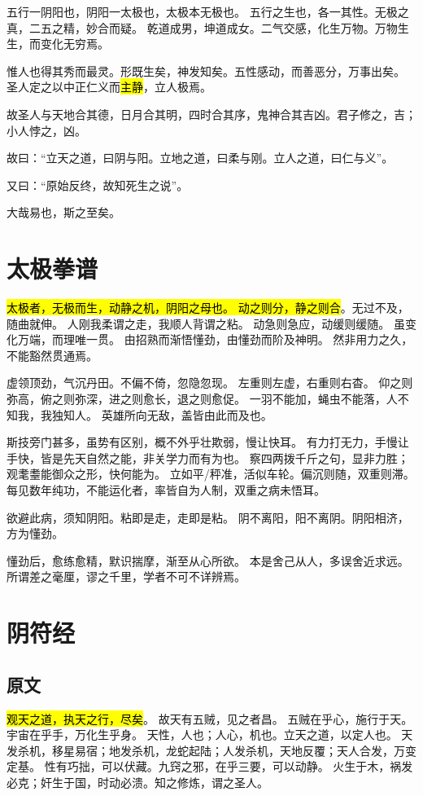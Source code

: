 五行一阴阳也，阴阳一太极也，太极本无极也。
五行之生也，各一其性。无极之真，二五之精，妙合而疑。
乾道成男，坤道成女。二气交感，化生万物。万物生生，而变化无穷焉。

惟人也得其秀而最灵。形既生矣，神发知矣。五性感动，而善恶分，万事出矣。
圣人定之以中正仁义而\hl{主静}，立人极焉。

故圣人与天地合其德，日月合其明，四时合其序，鬼神合其吉凶。君子修之，吉；小人悖之，凶。

故曰：“立天之道，曰阴与阳。立地之道，曰柔与刚。立人之道，曰仁与义”。

又曰：“原始反终，故知死生之说”。

大哉易也，斯之至矣。

\section{太极拳谱}

\hl{太极者，无极而生，动静之机，阴阳之母也。
动之则分，静之则合}。无过不及，随曲就伸。
人刚我柔谓之走，我顺人背谓之粘。
动急则急应，动缓则缓随。
虽变化万端，而理唯一贯。
由招熟而渐悟懂劲，由懂劲而阶及神明。
然非用力之久，不能豁然贯通焉。

虚领顶劲，气沉丹田。不偏不倚，忽隐忽现。
左重则左虚，右重则右杳。
仰之则弥高，俯之则弥深，进之则愈长，退之则愈促。
一羽不能加，蝇虫不能落，人不知我，我独知人。
英雄所向无敌，盖皆由此而及也。

斯技旁门甚多，虽势有区别，概不外乎壮欺弱，慢让快耳。
有力打无力，手慢让手快，皆是先天自然之能，非关学力而有为也。
察四两拨千斤之句，显非力胜；观耄耋能御众之形，快何能为。
立如平/秤准，活似车轮。偏沉则随，双重则滞。
每见数年纯功，不能运化者，率皆自为人制，双重之病未悟耳。

欲避此病，须知阴阳。粘即是走，走即是粘。
阴不离阳，阳不离阴。阴阳相济，方为懂劲。

懂劲后，愈练愈精，默识揣摩，渐至从心所欲。
本是舍己从人，多误舍近求远。
所谓差之毫厘，谬之千里，学者不可不详辨焉。

\section{阴符经}

\subsection{原文}

\hl{观天之道，执天之行，尽矣}。
故天有五贼，见之者昌。
五贼在乎心，施行于天。宇宙在乎手，万化生乎身。
天性，人也；人心，机也。立天之道，以定人也。
天发杀机，移星易宿；地发杀机，龙蛇起陆；人发杀机，天地反覆；天人合发，万变定基。
性有巧拙，可以伏藏。九窍之邪，在乎三要，可以动静。
火生于木，祸发必克；奸生于国，时动必溃。知之修炼，谓之圣人。

